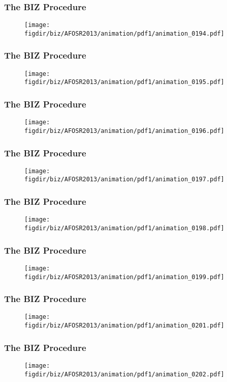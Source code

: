 \documentclass[13pt]{beamer}
\newcommand{\figdir}{../../fig}
\begin{document}
\begin{frame}\frametitle{The BIZ Procedure}\begin{figure}\texttt{[image: \\figdir/biz/AFOSR2013/animation/pdf1/animation\_0194.pdf]}\end{figure}\end{frame}
\begin{frame}\frametitle{The BIZ Procedure}\begin{figure}\texttt{[image: \\figdir/biz/AFOSR2013/animation/pdf1/animation\_0195.pdf]}\end{figure}\end{frame}
\begin{frame}\frametitle{The BIZ Procedure}\begin{figure}\texttt{[image: \\figdir/biz/AFOSR2013/animation/pdf1/animation\_0196.pdf]}\end{figure}\end{frame}
\begin{frame}\frametitle{The BIZ Procedure}\begin{figure}\texttt{[image: \\figdir/biz/AFOSR2013/animation/pdf1/animation\_0197.pdf]}\end{figure}\end{frame}
\begin{frame}\frametitle{The BIZ Procedure}\begin{figure}\texttt{[image: \\figdir/biz/AFOSR2013/animation/pdf1/animation\_0198.pdf]}\end{figure}\end{frame}
\begin{frame}\frametitle{The BIZ Procedure}\begin{figure}\texttt{[image: \\figdir/biz/AFOSR2013/animation/pdf1/animation\_0199.pdf]}\end{figure}\end{frame}
\begin{frame}\frametitle{The BIZ Procedure}\begin{figure}\texttt{[image: \\figdir/biz/AFOSR2013/animation/pdf1/animation\_0201.pdf]}\end{figure}\end{frame}
\begin{frame}\frametitle{The BIZ Procedure}\begin{figure}\texttt{[image: \\figdir/biz/AFOSR2013/animation/pdf1/animation\_0202.pdf]}\end{figure}\end{frame}
\end{document}
